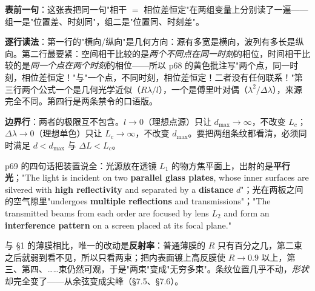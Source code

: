 \documentclass[10pt]{ctexart}
\begin{document}
\textbf{表前一句}：这张表把同一句"相干 $=$ 相位差恒定"在两组变量上分别读了一遍——组一是"位置差、时刻同"，组二是"位置同、时刻差"。

\textbf{逐行读法}：第一行的"横向/纵向"是几何方向：源有多宽是横向，波列有多长是纵向。第二行最要紧：空间相干比较的是\emph{两个不同点在同一时刻}的相位，时间相干比较的是\emph{同一个点在两个时刻}的相位——所以 p68 的黄色批注写"两个点，同一时刻，相位差恒定！"与"一个点，不同时刻，相位差恒定！二者没有任何联系！"第三行两个公式一个是几何光学近似（$R\lambda/l$），一个是傅里叶对偶（$\lambda^2/\Delta\lambda$），来源完全不同。第四行是两条禁令的口语版。

\textbf{边界行}：两者的极限互不包含。$l\to0$（理想点源）只让 $d_{\max}\to\infty$，不改变 $L_c$；$\Delta\lambda\to0$（理想单色）只让 $L_c\to\infty$，不改变 $d_{\max}$。要把两组条纹都看清，必须同时满足 $d<d_{\max}$ 与 $\Delta L<L_c$。


\flowerrule



p69 的四句话把装置说全：光源放在透镜 $L_1$ 的物方焦平面上，出射的是\textbf{平行光}；"The light is incident on two \textbf{parallel glass plates}, whose inner surfaces are silvered with \textbf{high reflectivity} and separated by a \textbf{distance} $d$"；光在两板之间的空气隙里"undergoes \textbf{multiple reflections} and transmissions"；"The transmitted beams from each order are focused by lens $L_2$ and form an \textbf{interference pattern} on a screen placed at its focal plane."

与 \S1 的薄膜相比，唯一的改动是\textbf{反射率}：普通薄膜的 $R$ 只有百分之几，第二束之后就弱到看不见，所以只看两束；把内表面镀上高反膜使 $R\to0.9$ 以上，第三、第四、……束仍然可观，于是"两束"变成"无穷多束"。条纹位置几乎不动，\emph{形状}却完全变了——从余弦变成尖峰（\S7.5、\S7.6）。
\end{document}
